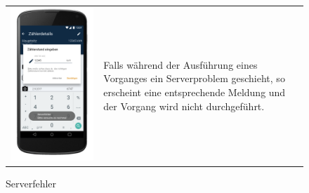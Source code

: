 \begin{figure}[h]
\begin{tabularx}{\textwidth}{X  X}
	\includegraphics[scale = 0.155]{img/AndroidMockup/serverException} \caption{Serverfehler} & Falls während der Ausführung eines Vorganges ein Serverproblem geschieht, so erscheint eine entsprechende Meldung und der Vorgang wird nicht durchgeführt.\\

\end{tabularx}
\end{figure}

